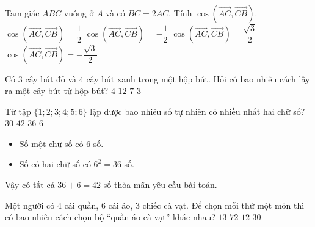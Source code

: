 \begin{ex}%
Tam giác $ABC$ vuông ở $A$ và có $BC=2AC$. Tính $\cos\left(\overrightarrow{AC},\overrightarrow{CB}\right)$.
\choice
{$\cos\left(\overrightarrow{AC},\overrightarrow{CB}\right)=\dfrac{1}{2}$}
{\True $\cos\left(\overrightarrow{AC},\overrightarrow{CB}\right)=-\dfrac{1}{2}$}
{$\cos\left(\overrightarrow{AC},\overrightarrow{CB}\right)=\dfrac{\sqrt{3}}{2}$}
{$\cos\left(\overrightarrow{AC},\overrightarrow{CB}\right)=-\dfrac{\sqrt{3}}{2}$}
\end{ex}

\begin{ex} %
Có $3$ cây bút đỏ và $4$ cây bút xanh trong một hộp bút. Hỏi có bao nhiêu cách lấy ra một cây bút từ hộp bút?
\choice
{$4$}
{$12$}
{\True $7$}
{$3$}
\end{ex}

\begin{ex}%
Từ tập $\{1;2;3;4;5;6\}$ lập được bao nhiêu số tự nhiên có nhiều nhất hai chữ số?
\choice
{$30$}
{\True $42$}
{$36$}
{$6$}
\loigiai
{
\begin{itemize}
\item Số một chữ số có $6$ số.
\item Số có hai chữ số có $6^2=36$ số.
\end{itemize}
Vậy có tất cả $36+6=42$ số thỏa mãn yêu cầu bài toán.
}
\end{ex}

\begin{ex}%
Một người có $4$ cái quần, $6$ cái áo, $3$ chiếc cà vạt. Để chọn mỗi thứ một món thì có bao nhiêu cách chọn bộ ``quần-áo-cà vạt'' khác nhau?
\choice
{$13$}
{\True $72$}
{$12$}
{$30$}
\end{ex}


